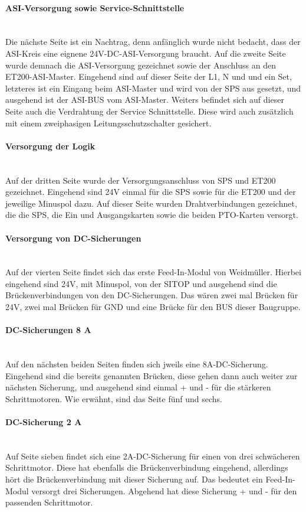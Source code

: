     \paragraph{ASI-Versorgung sowie Service-Schnittstelle}\mbox{}\\
    Die nächste Seite ist ein Nachtrag, denn anfänglich wurde nicht bedacht, dass der ASI-Kreis eine eignene 24V-DC-ASI-Versorgung braucht. Auf die zweite Seite wurde demnach die ASI-Versorgung gezeichnet sowie der Anschluss an den ET200-ASI-Master. Eingehend sind auf dieser Seite der L1, N und und ein Set, letzteres ist ein Eingang beim ASI-Master und wird von der SPS aus gesetzt, und ausgehend ist der ASI-BUS vom ASI-Master. Weiters befindet sich auf dieser Seite auch die Verdrahtung der Service Schnittstelle. Diese wird auch zusätzlich mit einem zweiphasigen Leitungsschutzschalter gesichert.
    \paragraph{Versorgung der Logik}\mbox{}\\
    Auf der dritten Seite wurde der Versorgungsanschluss von SPS und ET200 gezeichnet. Eingehend sind 24V einmal für die SPS sowie für die ET200 und der jeweilige Minuspol dazu. Auf dieser Seite wurden Drahtverbindungen gezeichnet, die die SPS, die Ein und Ausgangskarten sowie die beiden PTO-Karten versorgt.
    \paragraph{Versorgung von DC-Sicherungen}\mbox{}\\
    Auf der vierten Seite findet sich das erste Feed-In-Modul von Weidmüller. Hierbei eingehend sind 24V, mit Minuspol, von der SITOP und ausgehend sind die Brückenverbindungen von den DC-Sicherungen. Das wären zwei mal Brücken für 24V, zwei mal Brücken für GND und eine Brücke für den BUS dieser Baugruppe.
    \paragraph{DC-Sicherungen 8 A}\mbox{}\\
    Auf den nächsten beiden Seiten finden sich jweils eine 8A-DC-Sicherung. Eingehend sind die bereits genannten Brücken, diese gehen dann auch weiter zur nächsten Sicherung, und ausgehend sind einmal + und - für die stärkeren Schrittmotoren. Wie erwähnt, sind das Seite fünf und sechs.
    \paragraph{DC-Sicherung 2 A}\mbox{}\\
    Auf Seite sieben findet sich eine 2A-DC-Sicherung für einen von drei schwächeren Schrittmotor. Diese hat ebenfalls die Brückenverbindung eingehend, allerdings hört die Brückenverbindung mit dieser Sicherung auf. Das bedeutet ein Feed-In-Modul versorgt drei Sicherungen. Abgehend hat diese Sicherung + und - für den passenden Schrittmotor.
